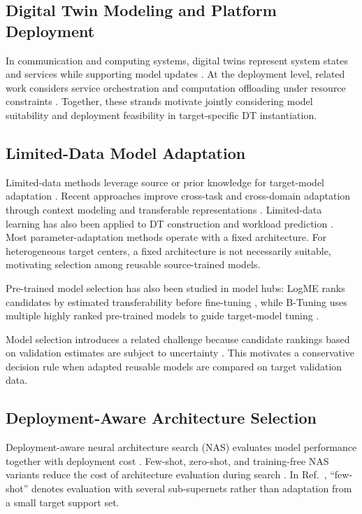 \documentclass[a4paper,fleqn]{cas-sc}
\begin{document}
\subsection{Digital Twin Modeling and Platform Deployment}

In communication and computing systems, digital twins represent system states
and services while supporting model updates \cite{ref5,ref6,ref7,ref8}.
At the deployment level, related work considers service orchestration and
computation offloading under resource constraints \cite{ref27,ref28}.
Together, these strands motivate jointly considering model suitability and
deployment feasibility in target-specific DT instantiation.

\subsection{Limited-Data Model Adaptation}

Limited-data methods leverage source or prior knowledge for target-model
adaptation \cite{ref9,ref10,ref24}. Recent approaches improve cross-task and
cross-domain adaptation through context modeling and transferable
representations \cite{ref20,ref21,ref22,ref23}. Limited-data learning has also
been applied to DT construction and workload prediction \cite{ref11,ref25}.
Most parameter-adaptation methods operate with a fixed architecture. For
heterogeneous target centers, a fixed architecture is not necessarily suitable,
motivating selection among reusable source-trained models.

Pre-trained model selection has also been studied in model hubs: LogME ranks
candidates by estimated transferability before fine-tuning \cite{refLogME},
while B-Tuning uses multiple highly ranked pre-trained models to guide
target-model tuning \cite{refBTuning}.

Model selection introduces a related challenge because candidate rankings
based on validation estimates are subject to uncertainty
\cite{ref33,ref34}. This motivates a conservative decision rule when adapted
reusable models are compared on target validation data.

\subsection{Deployment-Aware Architecture Selection}

Deployment-aware neural architecture search (NAS) evaluates model performance
together with deployment cost \cite{ref12,ref13,ref26}. Few-shot, zero-shot,
and training-free NAS variants reduce the cost of architecture evaluation
during search \cite{ref14,ref15,ref16}. In Ref.~\cite{ref14}, ``few-shot''
denotes evaluation with several sub-supernets rather than adaptation from a
small target support set.
\end{document}
